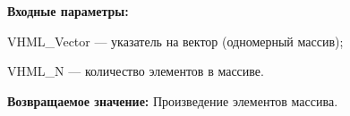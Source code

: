 \textbf{Входные параметры:}

 VHML\_Vector --- указатель на вектор (одномерный массив);
 
 VHML\_N --- количество элементов в массиве.

\textbf{Возвращаемое значение:}
 Произведение элементов массива.